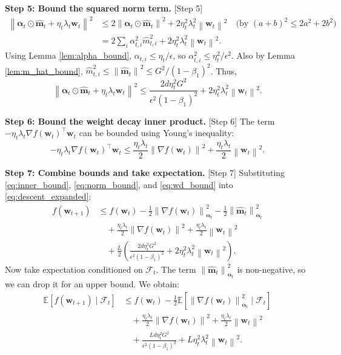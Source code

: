 \documentclass{article}
\theoremstyle{plain}
\theoremstyle{definition}
\renewcommand{\vec}[1]{\boldsymbol{#1}}
\newcommand{\norm}[1]{\left\| #1 \right\|}
\newcommand{\expect}[1]{\mathbb{E}\left[ #1 \right]}
\begin{document}
\textbf{Step 5: Bound the squared norm term.} [Step 5]
\begin{align}
    \norm{\vec{\alpha}_t \odot \hat{\vec{m}}_t + \eta_t \lambda_t \vec{w}_t}^2
    &\le 2 \norm{\vec{\alpha}_t \odot \hat{\vec{m}}_t}^2 + 2 \eta_t^2 \lambda_t^2 \norm{\vec{w}_t}^2 \quad \text{(by $(a+b)^2 \le 2a^2+2b^2$)} \\
    &= 2 \sum_i \alpha_{t,i}^2 \hat{m}_{t,i}^2 + 2 \eta_t^2 \lambda_t^2 \norm{\vec{w}_t}^2.
\end{align}
Using Lemma \ref{lem:alpha_bound}, $\alpha_{t,i} \le \eta_t / \epsilon$, so $\alpha_{t,i}^2 \le \eta_t^2 / \epsilon^2$. Also by Lemma \ref{lem:m_hat_bound}, $\hat{m}_{t,i}^2 \le \norm{\hat{\vec{m}}_t}^2 \le G^2/(1-\beta_1)^2$. Thus,
\begin{equation}
    \norm{\vec{\alpha}_t \odot \hat{\vec{m}}_t + \eta_t \lambda_t \vec{w}_t}^2 \le \frac{2 d \eta_t^2 G^2}{\epsilon^2 (1-\beta_1)^2} + 2 \eta_t^2 \lambda_t^2 \norm{\vec{w}_t}^2. \label{eq:norm_bound}
\end{equation}

\textbf{Step 6: Bound the weight decay inner product.} [Step 6]
The term $-\eta_t \lambda_t \nabla f(\vec{w}_t)^\top \vec{w}_t$ can be bounded using Young's inequality:
\begin{equation}
    -\eta_t \lambda_t \nabla f(\vec{w}_t)^\top \vec{w}_t \le \frac{\eta_t \lambda_t}{2} \norm{\nabla f(\vec{w}_t)}^2 + \frac{\eta_t \lambda_t}{2} \norm{\vec{w}_t}^2. \label{eq:wd_bound}
\end{equation}

\textbf{Step 7: Combine bounds and take expectation.} [Step 7]
Substituting \eqref{eq:inner_bound}, \eqref{eq:norm_bound}, and \eqref{eq:wd_bound} into \eqref{eq:descent_expanded}:
\begin{align}
    f(\vec{w}_{t+1}) &\le f(\vec{w}_t) - \frac{1}{2} \norm{\nabla f(\vec{w}_t)}_{\vec{\alpha}_t}^2 - \frac{1}{2} \norm{\hat{\vec{m}}_t}_{\vec{\alpha}_t}^2 \\
    &\quad + \frac{\eta_t \lambda_t}{2} \norm{\nabla f(\vec{w}_t)}^2 + \frac{\eta_t \lambda_t}{2} \norm{\vec{w}_t}^2 \\
    &\quad + \frac{L}{2} \left( \frac{2 d \eta_t^2 G^2}{\epsilon^2 (1-\beta_1)^2} + 2 \eta_t^2 \lambda_t^2 \norm{\vec{w}_t}^2 \right).
\end{align}
Now take expectation conditioned on $\mathcal{F}_t$. The term $\norm{\hat{\vec{m}}_t}_{\vec{\alpha}_t}^2$ is non-negative, so we can drop it for an upper bound. We obtain:
\begin{align}
    \expect{f(\vec{w}_{t+1}) \mid \mathcal{F}_t} &\le f(\vec{w}_t) - \frac{1}{2} \expect{\norm{\nabla f(\vec{w}_t)}_{\vec{\alpha}_t}^2 \mid \mathcal{F}_t} \\
    &\quad + \frac{\eta_t \lambda_t}{2} \norm{\nabla f(\vec{w}_t)}^2 + \frac{\eta_t \lambda_t}{2} \norm{\vec{w}_t}^2 \\
    &\quad + \frac{L d \eta_t^2 G^2}{\epsilon^2 (1-\beta_1)^2} + L \eta_t^2 \lambda_t^2 \norm{\vec{w}_t}^2.
\end{align}
\end{document}
